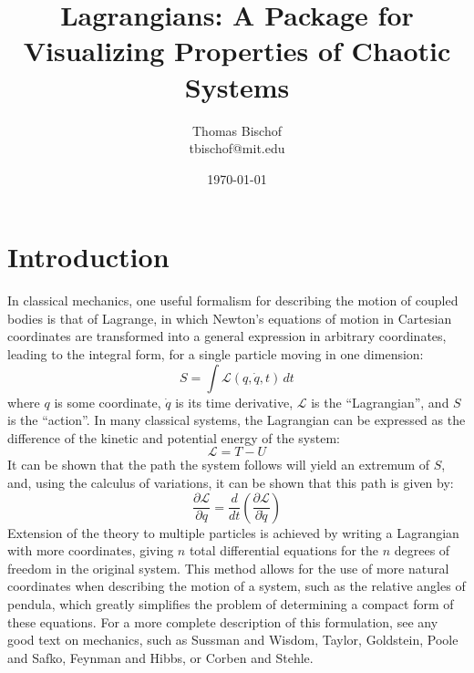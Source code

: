 \documentclass{article}
\title{Lagrangians: A Package for Visualizing Properties of Chaotic Systems}
\author{Thomas Bischof \\
tbischof@mit.edu}
\date{\today}
\newcommand{\lagrangian}{\ensuremath{\mathcal{L}}}
\newcommand{\ddt}{\frac{d}{dt}}
\begin{document}
\maketitle
\tableofcontents
\newpage

\section{Introduction}
In classical mechanics, one useful formalism for describing the motion of coupled bodies is that of Lagrange, in which Newton's equations of motion in Cartesian coordinates are transformed into a general expression in arbitrary coordinates, leading to the integral form, for a single particle moving in one dimension:
\begin{equation}
 S = \int{\lagrangian(q,\dot{q},t)\,dt}
\end{equation}
where $q$ is some coordinate, $\dot{q}$ is its time derivative, \lagrangian{} is the ``Lagrangian'', and $S$ is the ``action''. In many classical systems, the Lagrangian can be expressed as the difference of the kinetic and potential energy of the system:
\begin{equation}
\lagrangian = T-U
\end{equation}
It can be shown that the path the system follows will yield an extremum of $S$, and, using the calculus of variations, it can be shown that this path is given by:
\begin{equation}
 \frac{\partial\lagrangian}{\partial q} = \ddt\left(\frac{\partial\lagrangian}{\partial\dot{q}}\right)
\end{equation}
Extension of the theory to multiple particles is achieved by writing a Lagrangian with more coordinates, giving $n$ total differential equations for the $n$ degrees of freedom in the original system. This method allows for the use of more natural coordinates when describing the motion of a system, such as the relative angles of pendula, which greatly simplifies the problem of determining a compact form of these equations. For a more complete description of this formulation, see any good text on mechanics, such as Sussman and Wisdom\cite{sussman2001}, Taylor\cite{taylor2005}, Goldstein, Poole and Safko\cite{goldstein2000}, Feynman and Hibbs\cite{feynman2010}, or Corben and Stehle\cite{corben1994}.

\end{document}
